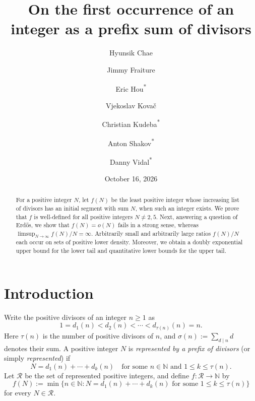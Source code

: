 \documentclass[11pt,letterpaper,reqno]{amsart}
\title{On the first occurrence of an integer as a prefix sum of divisors}
\author[Chae]{Hyunsik Chae}
\author[Fraiture]{Jimmy Fraiture}
\author[Hou]{Eric Hou\textsuperscript{*}}
\author[Kova\v{c}]{Vjekoslav Kova\v{c}}
\author[Kudeba]{Christian Kudeba\textsuperscript{*}}
\author[Shakov]{Anton Shakov\textsuperscript{*}}
\author[Vidal]{Danny Vidal\textsuperscript{*}}
\date{October 16, 2026}
\numberwithin{equation}{section}
\theoremstyle{remark}
\newcommand{\N}{\mathbb{N}}
\newcommand{\Rcal}{\mathcal{R}}
\renewcommand{\leq}{\leqslant}
\renewcommand{\geq}{\geqslant}
\begin{document}
\begin{abstract}
For a positive integer $N$, let $f(N)$ be the least positive integer whose increasing list of divisors has an initial segment with sum $N$, when such an integer exists. We prove that $f$ is well-defined for all positive integers $N\neq2,5$. Next, answering a question of Erd\H{o}s, we show that $f(N)=o(N)$ fails in a strong sense, whereas $\limsup_{N\to\infty}f(N)/N=\infty$. Arbitrarily small and arbitrarily large ratios $f(N)/N$ each occur on sets of positive lower density. Moreover, we obtain a doubly exponential upper bound for the lower tail and quantitative lower bounds for the upper tail.
\end{abstract}



\maketitle

\tableofcontents

\section{Introduction}\label{sec:introduction}

Write the positive divisors of an integer $n\geq1$ as
\[
 1=d_1(n)<d_2(n)<\cdots<d_{\tau(n)}(n)=n.
\]
Here $\tau(n)$ is the number of positive divisors of $n$, and
$\sigma(n):=\sum_{d\mid n}d$ denotes their sum.
A positive integer $N$ is \emph{represented by a prefix of divisors} (or simply \emph{represented}) if
\[
 N=d_1(n)+\cdots+d_k(n)
 \quad\text{for some }n\in\N\text{ and } 1\leq k\leq\tau(n).
\]
Let $\Rcal$ be the set of represented positive integers, and define $f\colon\Rcal\to\N$ by
\[
 f(N):=\min\{n\in\N : N=d_1(n)+\cdots+d_k(n)
 \text{ for some }1\leq k\leq\tau(n)\}
\]
for every $N\in\Rcal$.
\end{document}
